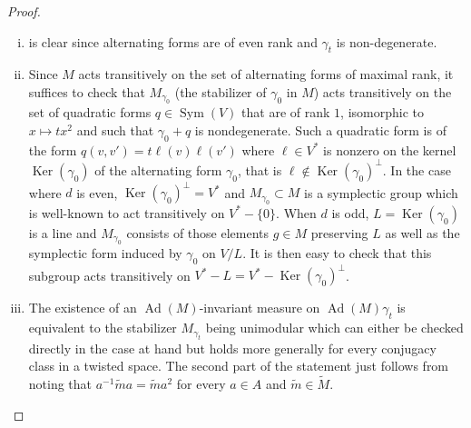 \documentclass[12pt]{article}
\numberwithin{equation}{section}
\def\tM{\widetilde{M}}
\DeclareMathOperator{\Ker}{Ker}
\DeclareMathOperator{\Ad}{Ad}
\DeclareMathOperator{\Sym}{Sym}
\begin{document}
	\begin{proof}
		\begin{enumerate}[(i)]
			\item is clear since alternating forms are of even rank and $\gamma_t$ is non-degenerate.
			
			\item Since $M$ acts transitively on the set of alternating forms of maximal rank, it suffices to check that $M_{\gamma_0}$ (the stabilizer of $\gamma_0$ in $M$) acts transitively on the set of quadratic forms $q\in \Sym(V)$ that are of rank $1$, isomorphic to $x\mapsto tx^2$ and such that $\gamma_0+q$ is nondegenerate. Such a quadratic form is of the form $q(v,v')=t\ell(v)\ell(v')$ where $\ell\in V^*$ is nonzero on the kernel $\Ker(\gamma_0)$ of the alternating form $\gamma_0$, that is $\ell\notin \Ker(\gamma_0)^\perp$. In the case where $d$ is even, $\Ker(\gamma_0)^\perp=V^*$ and $M_{\gamma_0}\subset M$ is a symplectic group which is well-known to act transitively on $V^*-\{0 \}$. When $d$ is odd, $L=\Ker(\gamma_0)$ is a line and $M_{\gamma_0}$ consists of those elements $g\in M$ preserving $L$ as well as the symplectic form induced by $\gamma_0$ on $V/L$. It is then easy to check that this subgroup acts transitively on $V^*-L=V^*- \Ker(\gamma_0)^\perp$.
			
			\item The existence of an $\Ad(M)$-invariant measure on $\Ad(M)\gamma_{t}$ is equivalent to the stabilizer $M_{\gamma_t}$ being unimodular which can either be checked directly in the case at hand but holds more generally for every conjugacy class in a twisted space. The second part of the statement just follows from noting that $a^{-1}\tilde{m}a=\tilde{m}a^2$ for every $a\in A$ and $\tilde{m}\in \tM$.
			

\end{enumerate}
\end{proof}
\end{document}
